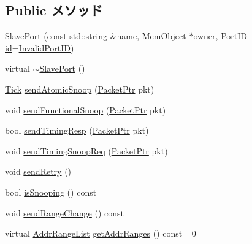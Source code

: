 \subsection*{Public メソッド}
\begin{DoxyCompactItemize}
\item 
\hyperlink{classSlavePort_a7f3816163b85700b0d74c0c275d030c9}{SlavePort} (const std::string \&name, \hyperlink{classMemObject}{MemObject} $\ast$\hyperlink{classPort_aba966efb6c1df4b015be3a396df6c318}{owner}, \hyperlink{base_2types_8hh_acef4d7d41cb21fdc252e20c04cd7bb8e}{PortID} \hyperlink{classPort_a0a67444fc1c33a60fe4a92bfff05d0cb}{id}=\hyperlink{base_2types_8hh_a65bf40f138cf863f0c5e2d8ca1144126}{InvalidPortID})
\item 
virtual \hyperlink{classSlavePort_a4756d4cc1faf925dc00225c5e66c8394}{$\sim$SlavePort} ()
\item 
\hyperlink{base_2types_8hh_a5c8ed81b7d238c9083e1037ba6d61643}{Tick} \hyperlink{classSlavePort_a4cc4d76bd3aaf333980c232125c8acc8}{sendAtomicSnoop} (\hyperlink{classPacket}{PacketPtr} pkt)
\item 
void \hyperlink{classSlavePort_a821cf873ae00e77f71d77505a63cfed7}{sendFunctionalSnoop} (\hyperlink{classPacket}{PacketPtr} pkt)
\item 
bool \hyperlink{classSlavePort_a0c021b2778a3358d110bd8700fe85732}{sendTimingResp} (\hyperlink{classPacket}{PacketPtr} pkt)
\item 
void \hyperlink{classSlavePort_a44317ff11e2c240ae72ca2f5f1d9076d}{sendTimingSnoopReq} (\hyperlink{classPacket}{PacketPtr} pkt)
\item 
void \hyperlink{classSlavePort_a6172657b944e32a722d90a20c5896bb7}{sendRetry} ()
\item 
bool \hyperlink{classSlavePort_a5ce11b7a254d3cb756d94568f7cbc25d}{isSnooping} () const 
\item 
void \hyperlink{classSlavePort_afb438cc39c4c679860c791bcef6dc7f3}{sendRangeChange} () const 
\item 
virtual \hyperlink{classstd_1_1list}{AddrRangeList} \hyperlink{classSlavePort_a6e967f8921e80748eb2be35b6b481a7e}{getAddrRanges} () const =0
\end{DoxyCompactItemize}

